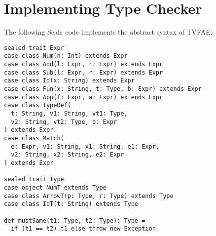 
\section{Implementing Type Checker}

The following Scala code implements the abstract syntax of TVFAE:

\begin{verbatim}
sealed trait Expr
case class Num(n: Int) extends Expr
case class Add(l: Expr, r: Expr) extends Expr
case class Sub(l: Expr, r: Expr) extends Expr
case class Id(x: String) extends Expr
case class Fun(x: String, t: Type, b: Expr) extends Expr
case class App(f: Expr, a: Expr) extends Expr
case class TypeDef(
  t: String, v1: String, vt1: Type,
  v2: String, vt2: Type, b: Expr
) extends Expr
case class Match(
  e: Expr, v1: String, x1: String, e1: Expr,
  v2: String, x2: String, e2: Expr
) extends Expr

sealed trait Type
case object NumT extends Type
case class ArrowT(p: Type, r: Type) extends Type
case class IdT(t: String) extends Type

def mustSame(t1: Type, t2: Type): Type =
  if (t1 == t2) t1 else throw new Exception
\end{verbatim}

